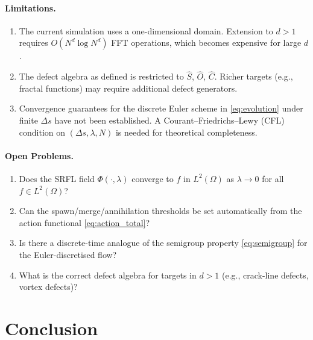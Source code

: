 \documentclass[12pt,a4paper]{article}
\theoremstyle{plain}
\theoremstyle{definition}
\theoremstyle{remark}
\begin{document}
\paragraph{Limitations.}
\begin{enumerate}[label=(\roman*)]
  \item The current simulation uses a one-dimensional domain.  Extension
    to $d > 1$ requires $O(N^d \log N^d)$ FFT operations, which becomes
    expensive for large $d$.
  \item The defect algebra as defined is restricted to $\hat{S}$, $\hat{O}$,
    $\hat{C}$.  Richer targets (e.g., fractal functions) may require
    additional defect generators.
  \item Convergence guarantees for the discrete Euler scheme in
    \eqref{eq:evolution} under finite $\Delta s$ have not been established.
    A Courant--Friedrichs--Lewy (CFL) condition on $(\Delta s, \lambda, N)$
    is needed for theoretical completeness.
\end{enumerate}

\paragraph{Open Problems.}
\begin{enumerate}[label=\textbf{Q\arabic*.}]
  \item Does the SRFL field $\Phi(\cdot,\lambda)$ converge to $f$ in
    $L^2(\Omega)$ as $\lambda \to 0$ for all $f \in L^2(\Omega)$?
  \item Can the spawn/merge/annihilation thresholds be set automatically
    from the action functional \eqref{eq:action_total}?
  \item Is there a discrete-time analogue of the semigroup property
    \eqref{eq:semigroup} for the Euler-discretised flow?
  \item What is the correct defect algebra for targets in $d > 1$
    (e.g., crack-line defects, vortex defects)?
\end{enumerate}

\section{Conclusion}
\label{sec:conclusion}
\end{document}
